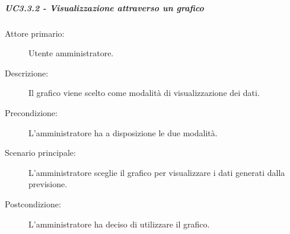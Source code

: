 \subparagraph{UC3.3.2 - Visualizzazione attraverso un grafico}
\label{sssec:uc3.3.2}
\begin{description}
  \item[Attore primario:] Utente amministratore.
  \item[Descrizione:] Il grafico viene scelto come modalità di visualizzazione dei dati.
  \item[Precondizione:] L'amministratore ha a disposizione le due modalità.
  \item[Scenario principale:] L'amministratore sceglie il grafico per visualizzare i dati generati dalla previsione.
  \item[Postcondizione:] L'amministratore ha deciso di utilizzare il grafico.
\end{description}
